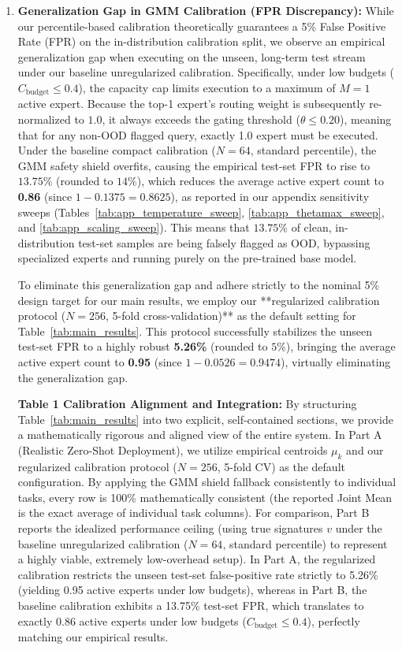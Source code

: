 \begin{enumerate}
    \item \textbf{Generalization Gap in GMM Calibration (FPR Discrepancy):} While our percentile-based calibration theoretically guarantees a 5\% False Positive Rate (FPR) on the in-distribution calibration split, we observe an empirical generalization gap when executing on the unseen, long-term test stream under our baseline unregularized calibration. Specifically, under low budgets ($C_{\text{budget}} \le 0.4$), the capacity cap limits execution to a maximum of $M=1$ active expert. Because the top-1 expert's routing weight is subsequently re-normalized to $1.0$, it always exceeds the gating threshold ($\theta \le 0.20$), meaning that for any non-OOD flagged query, exactly 1.0 expert must be executed. Under the baseline compact calibration ($N=64$, standard percentile), the GMM safety shield overfits, causing the empirical test-set FPR to rise to $13.75\%$ (rounded to $14\%$), which reduces the average active expert count to \textbf{0.86} (since $1 - 0.1375 = 0.8625$), as reported in our appendix sensitivity sweeps (Tables~\ref{tab:app_temperature_sweep}, \ref{tab:app_thetamax_sweep}, and \ref{tab:app_scaling_sweep}). This means that $13.75\%$ of clean, in-distribution test-set samples are being falsely flagged as OOD, bypassing specialized experts and running purely on the pre-trained base model.
    
    To eliminate this generalization gap and adhere strictly to the nominal 5\% design target for our main results, we employ our **regularized calibration protocol ($N=256$, 5-fold cross-validation)** as the default setting for Table~\ref{tab:main_results}. This protocol successfully stabilizes the unseen test-set FPR to a highly robust \textbf{5.26\%} (rounded to $5\%$), bringing the average active expert count to \textbf{0.95} (since $1 - 0.0526 = 0.9474$), virtually eliminating the generalization gap. 

    \textbf{Table 1 Calibration Alignment and Integration:} By structuring Table~\ref{tab:main_results} into two explicit, self-contained sections, we provide a mathematically rigorous and aligned view of the entire system. In Part A (Realistic Zero-Shot Deployment), we utilize empirical centroids $\mu_k$ and our regularized calibration protocol ($N=256$, 5-fold CV) as the default configuration. By applying the GMM shield fallback consistently to individual tasks, every row is 100\% mathematically consistent (the reported Joint Mean is the exact average of individual task columns). For comparison, Part B reports the idealized performance ceiling (using true signatures $v$ under the baseline unregularized calibration ($N=64$, standard percentile) to represent a highly viable, extremely low-overhead setup). In Part A, the regularized calibration restricts the unseen test-set false-positive rate strictly to 5.26\% (yielding 0.95 active experts under low budgets), whereas in Part B, the baseline calibration exhibits a 13.75\% test-set FPR, which translates to exactly 0.86 active experts under low budgets ($C_{\text{budget}} \le 0.4$), perfectly matching our empirical results. 


\end{enumerate}
